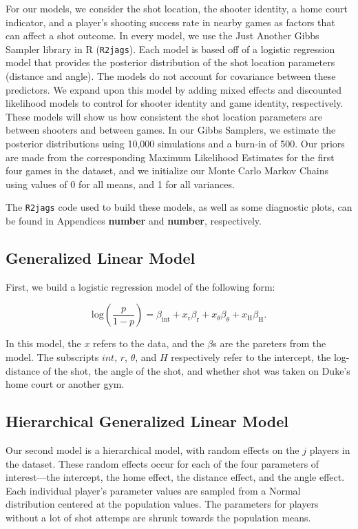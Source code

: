 \documentclass[12pt,twoside]{dukestatscithesis}
\theoremstyle{definition}
\theoremstyle{definition}
\theoremstyle{definition}
\theoremstyle{remark}
\begin{document}
For our models, we consider the shot location, the shooter identity, a
home court indicator, and a player's shooting success rate in nearby
games as factors that can affect a shot outcome. In every model, we use
the Just Another Gibbs Sampler library in R (\texttt{R2jags}). Each
model is based off of a logistic regression model that provides the
posterior distribution of the shot location parameters (distance and
angle). The models do not account for covariance between these
predictors. We expand upon this model by adding mixed effects and
discounted likelihood models to control for shooter identity and game
identity, respectively. These models will show us how consistent the
shot location parameters are between shooters and between games. In our
Gibbs Samplers, we estimate the posterior distributions using 10,000
simulations and a burn-in of 500. Our priors are made from the
corresponding Maximum Likelihood Estimates for the first four games in
the dataset, and we initialize our Monte Carlo Markov Chains using
values of 0 for all means, and 1 for all variances.

The \texttt{R2jags} code used to build these models, as well as some
diagnostic plots, can be found in Appendices \textbf{number} and
\textbf{number}, respectively.

\subsection{Generalized Linear Model}\label{generalized-linear-model}

First, we build a logistic regression model of the following form:

\[
\text{log} \left( \frac{p}{1-p} \right) = 
\beta_{\text{int}} +
x_{\text{r}}\beta_{\text{r}} +
x_{\theta}\beta_{\theta} +
x_{\text{H}}\beta_{\text{H}}.
\]

In this model, the \(x\) refers to the data, and the \(\beta\)s are the
pareters from the model. The subscripts \(\textit{int}\),
\(\textit{r}\), \(\theta\), and \(\textit{H}\) respectively refer to the
intercept, the log-distance of the shot, the angle of the shot, and
whether shot was taken on Duke's home court or another gym.

\subsection{Hierarchical Generalized Linear
Model}\label{hierarchical-generalized-linear-model}

Our second model is a hierarchical model, with random effects on the
\(\textit{j}\) players in the dataset. These random effects occur for
each of the four parameters of interest---the intercept, the home
effect, the distance effect, and the angle effect. Each individual
player's parameter values are sampled from a Normal distribution
centered at the population values. The parameters for players without a
lot of shot attemps are shrunk towards the population means.
\end{document}
